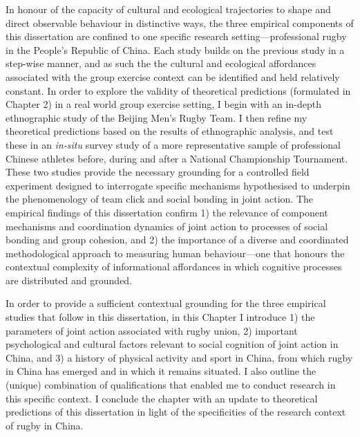 In honour of the capacity of cultural and ecological trajectories to shape and direct observable behaviour in distinctive ways, the three empirical components of this dissertation are confined to one specific research setting---professional rugby in the People's Republic of China. Each study builds on the previous study in a step-wise manner, and as such the the cultural and ecological affordances associated with the group exercise context can be identified and held relatively constant.  In order to explore the validity of theoretical predictions (formulated in Chapter 2) in a real world group exercise setting,  I begin with an in-depth ethnographic study of the Beijing Men's Rugby Team.  I then refine my theoretical predictions based on the results of ethnographic analysis, and test these in an \textit{in-situ} survey study of a more representative sample of professional Chinese athletes before, during and after a National Championship Tournament.  These two studies provide the necessary grounding for a controlled field experiment designed to interrogate specific mechanisms hypothesised to underpin the phenomenology of team click and social bonding in joint action.  The empirical findings of this dissertation confirm 1) the relevance of component mechanisms and coordination dynamics of joint action to processes of social bonding and group cohesion, and 2) the importance of a diverse and coordinated methodological approach to measuring human behaviour---one that honours the contextual complexity of informational affordances in which cognitive processes are distributed and grounded.

In order to provide a sufficient contextual grounding for the three empirical studies that follow in this dissertation, in this Chapter I introduce 1) the parameters of joint action associated with rugby union, 2) important psychological and cultural factors relevant to social cognition of joint action in China, and 3) a history of physical activity and sport in China, from which rugby in China has emerged and in which it remains situated. I also outline the (unique) combination of qualifications that enabled me to conduct research in this specific context.  I conclude the chapter with an update to theoretical predictions of this dissertation in light of the specificities of the research context of rugby in China.


